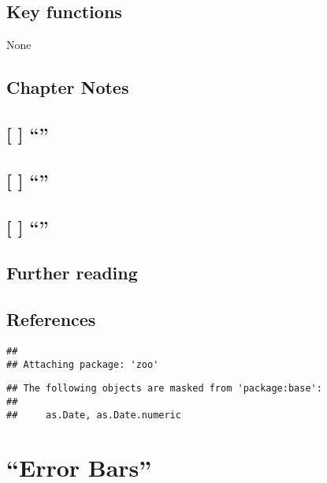 \documentclass[]{book}
\theoremstyle{definition}
\theoremstyle{definition}
\theoremstyle{definition}
\theoremstyle{remark}
\begin{document}
\section*{Key functions}\label{key-functions-11}

None

\section*{Chapter Notes}\label{chapter-notes-12}

\section{\texorpdfstring{{[} {]} ``''}{{[} {]} }}\label{section-18}

\section{\texorpdfstring{{[} {]} ``''}{{[} {]} }}\label{section-19}

\section{\texorpdfstring{{[} {]} ``''}{{[} {]} }}\label{section-20}

\section*{Further reading}\label{further-reading-11}

\section*{References}\label{references-11}

\begin{verbatim}
## 
## Attaching package: 'zoo'
\end{verbatim}

\begin{verbatim}
## The following objects are masked from 'package:base':
## 
##     as.Date, as.Date.numeric
\end{verbatim}

\chapter{\texorpdfstring{``Error Bars''}{Error Bars}}\label{error-bars}
\end{document}
